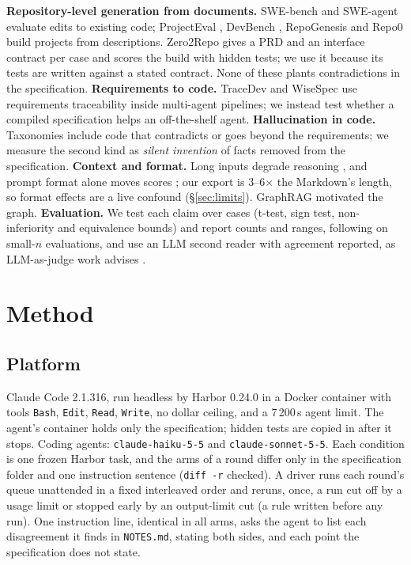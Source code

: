 \documentclass{article}
\newcommand{\code}[1]{\texttt{#1}}
\begin{document}
\textbf{Repository-level generation from documents.} SWE-bench \citep{jimenez2024swebench} and SWE-agent
\citep{yang2024sweagent} evaluate edits to existing code; ProjectEval \citep{liu2025projecteval}, DevBench
\citep{kumarappan2026devbench}, RepoGenesis \citep{peng2026repogenesis} and Repo0 \citep{chen2026repo0}
build projects from descriptions. Zero2Repo \citep{yang2026zero2repo} gives a PRD and an interface contract per case and
scores the build with hidden tests; we use it because its tests are written against a stated contract.
None of these plants contradictions in the specification. \textbf{Requirements to code.} TraceDev
\citep{chen2026tracedev} and WiseSpec \citep{tian2026wisespec} use requirements traceability inside
multi-agent pipelines; we instead test whether a compiled specification helps an off-the-shelf agent.
\textbf{Hallucination in code.} Taxonomies \citep{liu2024halucode,zhang2025hallucination,lee2025hallucination}
include code that contradicts or goes beyond the requirements; we measure the second kind as \emph{silent
invention} of facts removed from the specification. \textbf{Context and format.} Long inputs degrade
reasoning \citep{liu2024lost,levy2024moretokens}, and prompt format alone moves scores
\citep{he2024format,sclar2024format}; our export is 3--6$\times$ the Markdown's length, so format effects are a
live confound (\S\ref{sec:limits}). GraphRAG \citep{edge2024graphrag} motivated the graph.
\textbf{Evaluation.} We test each claim over cases (t-test, sign test, non-inferiority and equivalence
bounds) and report counts and ranges, following \citet{miller2024errorbars} on small-$n$ evaluations, and use
an LLM second reader with agreement reported, as LLM-as-judge work advises
\citep{zheng2023judge,crupi2025judge}.

\section{Method}

\subsection{Platform}

Claude Code 2.1.316, run headless by Harbor 0.24.0 \citep{harbor_docs} in a Docker container with tools
\code{Bash}, \code{Edit}, \code{Read}, \code{Write}, no dollar ceiling, and a 7\,200\,s agent limit. The agent's
container holds only the specification; hidden tests are copied in after it stops. Coding agents:
\code{claude-haiku-5-5} and \code{claude-sonnet-5-5}. Each condition is one frozen Harbor task, and the arms of
a round differ only in the specification folder and one instruction sentence (\code{diff -r} checked). A
driver runs each round's queue unattended in a fixed interleaved order and reruns, once, a run cut off by
a usage limit or stopped early by an output-limit cut (a rule written before any run). One instruction
line, identical in all arms, asks the agent to list each disagreement it finds in \code{NOTES.md}, stating
both sides, and each point the specification does not state.
\end{document}
